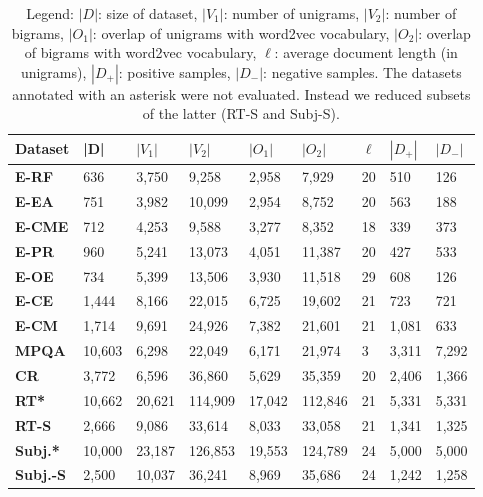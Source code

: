 \begin{table}
\centering

\begin{tabular}{l|llllllll}
\textbf{Dataset}  & |D|    & $|V_1|$ & $|V_2|$ & $|O_1|$ & $|O_2|$ & $\ell$ & $|D_+|$ & $|D_-|$ \\ \hline
\textbf{E-RF}     & 636    & 3,750   & 9,258   & 2,958   & 7,929   & 20     & 510     & 126     \\
\textbf{E-EA}     & 751    & 3,982   & 10,099  & 2,954   & 8,752   & 20     & 563     & 188     \\
\textbf{E-CME}    & 712    & 4,253   & 9,588   & 3,277   & 8,352   & 18     & 339     & 373     \\
\textbf{E-PR}     & 960    & 5,241   & 13,073  & 4,051   & 11,387  & 20     & 427     & 533     \\
\textbf{E-OE}     & 734    & 5,399   & 13,506  & 3,930   & 11,518  & 29     & 608     & 126     \\
\textbf{E-CE}     & 1,444  & 8,166   & 22,015  & 6,725   & 19,602  & 21     & 723     & 721     \\
\textbf{E-CM}     & 1,714  & 9,691   & 24,926  & 7,382   & 21,601  & 21     & 1,081   & 633     \\
\hline
\textbf{MPQA}     & 10,603 & 6,298   & 22,049  & 6,171   & 21,974  & 3      & 3,311   & 7,292   \\
\textbf{CR}       & 3,772  & 6,596   & 36,860  & 5,629   & 35,359  & 20     & 2,406   & 1,366   \\
\textbf{RT*}       & 10,662 & 20,621  & 114,909 & 17,042  & 112,846 & 21     & 5,331   & 5,331   \\
\textbf{RT-S}     & 2,666  & 9,086   & 33,614  & 8,033   & 33,058  & 21     & 1,341   & 1,325   \\
\textbf{Subj.*}    & 10,000 & 23,187  & 126,853 & 19,553  & 124,789 & 24     & 5,000   & 5,000   \\
\textbf{Subj.-S}  & 2,500  & 10,037  & 36,241  & 8,969   & 35,686  & 24     & 1,242   & 1,258   \\  
\end{tabular}
\caption{Legend: $|D|$: size of dataset, $|V_1|$: number of unigrams, $|V_2|$: number of bigrams, 
				 $|O_1|$: overlap of unigrams with word2vec vocabulary, $|O_2|$: overlap of bigrams with word2vec vocabulary,
				 $\ell$: average document length (in unigrams), $|D_+|$: positive samples, $|D_-|$: negative samples. The datasets
				 annotated with an asterisk were not evaluated. Instead we reduced subsets of the latter (RT-S and Subj-S).}
\label{tbl:datasets}
\end{table}
